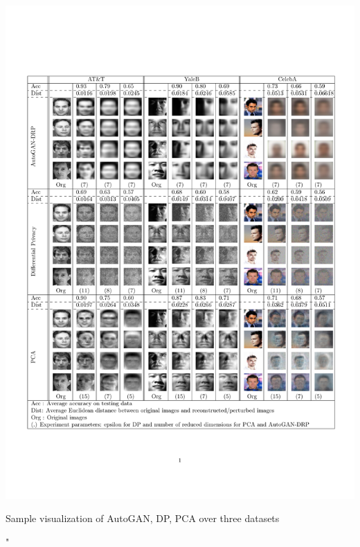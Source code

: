 \begin{table}[H]
	\centering
	\includegraphics[width=0.8\linewidth, trim=1cm 3cm 1cm 3cm, clip=true]{tables/img_table}
	\caption{Sample visualization of AutoGAN, DP, PCA over three datasets}
	\label{table:visualization}
\end{table}

"